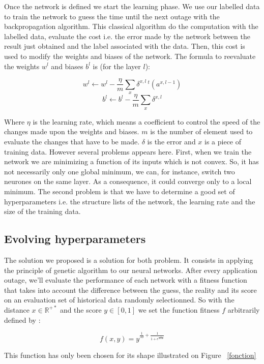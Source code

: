 \documentclass[10pt,a4paper,oneside]{article}
\begin{document}
\vspace{0.8cm}

\begin{multicols}{2}
Once the network is defined we start the learning phase. We use our labelled data to train the network to guess the time until the next outage with the backpropagation algorithm. This classical algorithm do the computation with the labelled data, evaluate the cost i.e. the error made by the network between the result just obtained and the label associated with the data. Then, this cost is used to modify the weights and biases of the network.
The formula to reevaluate the weights $w^l$ and biases $b^l$ is (for the layer $l$):

\vspace{0.8cm}

\begin{Large}
\[ w^l \leftarrow  w^l-\frac{\eta}{m} \sum_x \delta^{x,l} \,{}^t(a^{x,l-1}) \]
\[ b^l \leftarrow b^l-\frac{\eta}{m} \sum_x \delta^{x,l} \]
\end{Large}

\vspace{0.8cm}


Where $\eta$ is the learning rate, which means a coefficient to control the speed of the changes made upon the weights and biases. $m$ is the number of element used to evaluate the changes that have to be made. $\delta$ is the error and $x$ is a piece of training data.
However several problems appears here. First, when we train the network we are minimizing a function of its inputs which is not convex. So, it has not necessarily only one global minimum, we can, for instance, switch two neurones on the same layer. As a consequence, it could converge only to a local minimum.
The second problem is that we have to determine a good set of hyperparameters i.e. the structure lists of the network, the learning rate and the size of the training data.

\subsection{Evolving hyperparameters}
The solution we proposed is a solution for both problem. It consists in applying the principle of genetic algorithm to our neural networks. After every application outage, we'll evaluate the performance of each network with a fitness function that takes into account the difference between the guess, the reality and its score on an evaluation set of historical data randomly selectionned. So with the distance $x\in\mathbb{R}^{+*}$ and the score $y\in[0, 1]$ we set the function fitness $f$ arbitrarily defined by :

\vspace{0.8cm}

\begin{Large}
\[ f(x, y) = y^{\frac{1}{50}+\frac{1}{1+e^{\frac{1}{1+x}}}} \]
\end{Large}

\vspace{0.8cm}

This function has only been chosen for its shape illustrated on Figure ~\ref{fonction}

\end{multicols}
\end{document}
